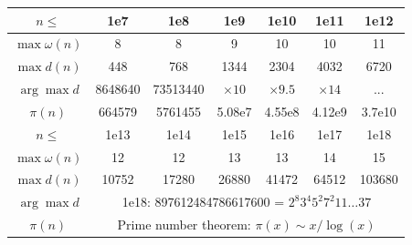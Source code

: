 \begin{table}[H]
\begin{tabular}{|c|c|c|c|c|c|c|}
			\hline
			\rowcolor{black!10} $n \leq$ & 1e7 & 1e8 & 1e9 & 1e10 & 1e11& 1e12\\
			\hline
			$\max\omega(n)$ & 8 & 8 & 9 & 10& 10 & 11 \\
			\hline
			$\max{d(n)}$ & 448 & 768 & 1344 & 2304 & 4032 & 6720 \\
			\hline
			$\arg\max d$ & 8648640 & 73513440 & $\times 10$ & $\times 9.5$ & $\times 14$ & ... \\
			\hline
			$\pi(n)$ & 664579 & 5761455 & 5.08e7 & 4.55e8 & 4.12e9 & 3.7e10 \\
			\hline
			\rowcolor{black!10} $n \leq$ & 1e13& 1e14& 1e15& 1e16& 1e17& 1e18 \\
			\hline
			$\max\omega(n)$ & 12 & 12 & 13 & 13 & 14 & 15 \\
			\hline
			$\max{d(n)}$ & 10752 & 17280 & 26880 & 41472 & 64512 & 103680\\
			\hline
			$\arg\max d$ & \multicolumn{6}{c|}{1e18: 897612484786617600 = $2^{8} 3^{4} 5^2 7 ^ 2 11 \dots 37$} \\
			\hline
			$\pi(n)$ & \multicolumn{6}{c|}{Prime number theorem: $\pi(x) \sim x / \log (x)$} \\
			\hline
			\end{tabular}

	\end{table}
